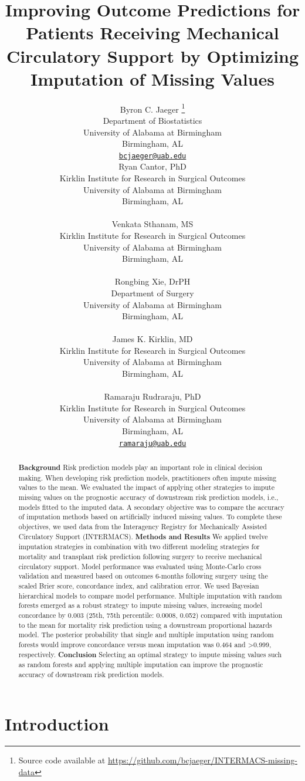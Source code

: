 \documentclass{article}
\title{Improving Outcome Predictions for Patients Receiving Mechanical
Circulatory Support by Optimizing Imputation of Missing Values}
\author{
    Byron C. Jaeger
    \thanks{Source code available at
\url{https://github.com/bcjaeger/INTERMACS-missing-data}}
   \\
    Department of Biostatistics \\
    University of Alabama at Birmingham \\
  Birmingham, AL \\
  \texttt{\href{mailto:bcjaeger@uab.edu}{\nolinkurl{bcjaeger@uab.edu}}} \\
   \And
    Ryan Cantor, PhD
   \\
    Kirklin Institute for Research in Surgical Outcomes \\
    University of Alabama at Birmingham \\
  Birmingham, AL \\
  \texttt{} \\
   \And
    Venkata Sthanam, MS
   \\
    Kirklin Institute for Research in Surgical Outcomes \\
    University of Alabama at Birmingham \\
  Birmingham, AL \\
  \texttt{} \\
   \And
    Rongbing Xie, DrPH
   \\
    Department of Surgery \\
    University of Alabama at Birmingham \\
  Birmingham, AL \\
  \texttt{} \\
   \And
    James K. Kirklin, MD
   \\
    Kirklin Institute for Research in Surgical Outcomes \\
    University of Alabama at Birmingham \\
  Birmingham, AL \\
  \texttt{} \\
   \And
    Ramaraju Rudraraju, PhD
   \\
    Kirklin Institute for Research in Surgical Outcomes \\
    University of Alabama at Birmingham \\
  Birmingham, AL \\
  \texttt{\href{mailto:ramaraju@uab.edu}{\nolinkurl{ramaraju@uab.edu}}} \\
  }
\begin{document}
\maketitle

\def\tightlist{}


\begin{abstract}
\textbf{Background} Risk prediction models play an important role in
clinical decision making. When developing risk prediction models,
practitioners often impute missing values to the mean. We evaluated the
impact of applying other strategies to impute missing values on the
prognostic accuracy of downstream risk prediction models, i.e., models
fitted to the imputed data. A secondary objective was to compare the
accuracy of imputation methods based on artificially induced missing
values. To complete these objectives, we used data from the Interagency
Registry for Mechanically Assisted Circulatory Support (INTERMACS).
\newline\textbf{Methods and Results} We applied twelve imputation
strategies in combination with two different modeling strategies for
mortality and transplant risk prediction following surgery to receive
mechanical circulatory support. Model performance was evaluated using
Monte-Carlo cross validation and measured based on outcomes 6-months
following surgery using the scaled Brier score, concordance index, and
calibration error. We used Bayesian hierarchical models to compare model
performance. Multiple imputation with random forests emerged as a robust
strategy to impute missing values, increasing model concordance by 0.003
(25th, 75th percentile: 0.0008, 0.052) compared with imputation to the
mean for mortality risk prediction using a downstream proportional
hazards model. The posterior probability that single and multiple
imputation using random forests would improve concordance versus mean
imputation was 0.464 and \textgreater0.999, respectively.
\newline\textbf{Conclusion} Selecting an optimal strategy to impute
missing values such as random forests and applying multiple imputation
can improve the prognostic accuracy of downstream risk prediction
models.
\end{abstract}


\hypertarget{introduction}{%
\section{Introduction}\label{introduction}}
\end{document}
